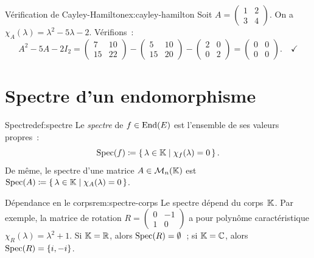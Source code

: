 \begin{example}{Vérification de Cayley-Hamilton}{ex:cayley-hamilton}
  Soit $A=\begin{pmatrix}1&2\\3&4\end{pmatrix}$. On a
  $\chi_A(\lambda)=\lambda^2-5\lambda-2$. Vérifions~:
  \[
    A^2-5A-2I_2=\begin{pmatrix}7&10\\15&22\end{pmatrix}
    -\begin{pmatrix}5&10\\15&20\end{pmatrix}
    -\begin{pmatrix}2&0\\0&2\end{pmatrix}
    =\begin{pmatrix}0&0\\0&0\end{pmatrix}. \quad\checkmark
  \]
\end{example}

\section{Spectre d'un endomorphisme}\label{sec:spectre}

\begin{definition}{Spectre}{def:spectre}
  Le \emph{spectre} de $f\in\operatorname{End}(E)$ est l'ensemble de ses valeurs
  propres~:
  \[
    \operatorname{Spec}(f)\coloneqq\left\{\,\lambda\in{\mathbb{K}}\;\middle|\;\chi_f(\lambda)=0\,\right\}.
  \]
  De même, le spectre d'une matrice $A\in\mathcal{M}_n({\mathbb{K}})$ est
  $\operatorname{Spec}(A)\coloneqq\left\{\,\lambda\in{\mathbb{K}}\;\middle|\;\chi_A(\lambda)=0\,\right\}$.
\end{definition}

\begin{remark}{Dépendance en le corps}{rem:spectre-corps}
  Le spectre dépend du corps~${\mathbb{K}}$. Par exemple, la matrice de rotation
  $R=\begin{pmatrix}0&-1\\1&0\end{pmatrix}$ a pour polynôme
  caractéristique $\chi_R(\lambda)=\lambda^2+1$. Si ${\mathbb{K}}={\mathbb{R}}$, alors
  $\operatorname{Spec}(R)=\emptyset$~; si ${\mathbb{K}}={\mathbb{C}}$, alors $\operatorname{Spec}(R)=\left\{i,-i\right\}$.
\end{remark}

